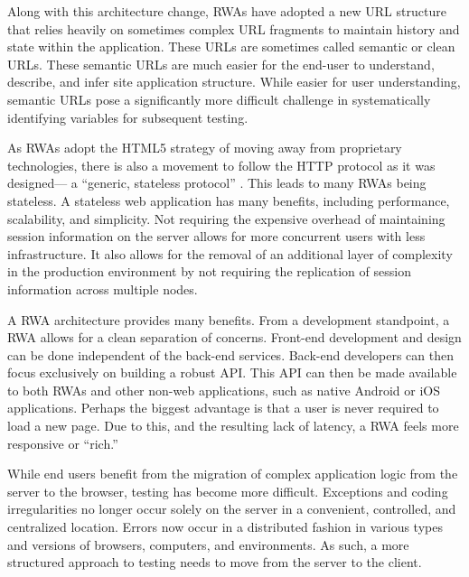 Along with this architecture change, RWAs have adopted a new URL structure that relies heavily on sometimes complex URL fragments to maintain history and state within the application.  These URLs are sometimes called semantic or clean URLs.  These semantic URLs are much easier for the end-user to understand, describe, and infer site application structure.  While easier for user understanding, semantic URLs pose a significantly more difficult challenge in systematically identifying variables for subsequent testing.

As RWAs adopt the HTML5 strategy of moving away from proprietary technologies, there is also a movement to follow the HTTP protocol as it was designed--- a ``generic, stateless protocol'' \cite{berners1999hypertext}.  This leads to many RWAs being stateless.  A stateless web application has many benefits, including performance, scalability, and simplicity.  Not requiring the expensive overhead of maintaining session information on the server allows for more concurrent users with less infrastructure.  It also allows for the removal of an additional layer of complexity in the production environment by not requiring the replication of session information across multiple nodes.

A RWA architecture provides many benefits.  From a development standpoint, a RWA allows for a clean separation of concerns.  Front-end development and design can be done independent of the back-end services.  Back-end developers can then focus exclusively on building a robust API.  This API can then be made available to both RWAs and other non-web applications, such as native Android or iOS applications.  Perhaps the biggest advantage is that a user is never required to load a new page.  Due to this, and the resulting lack of latency, a RWA feels more responsive or ``rich.''

While end users benefit from the migration of complex application logic from the server to the browser, testing has become more difficult.  Exceptions and coding irregularities no longer occur solely on the server in a convenient, controlled, and centralized location.  Errors now occur in a distributed fashion in various types and versions of browsers, computers, and environments.  As such, a more structured approach to testing needs to move from the server to the client.

